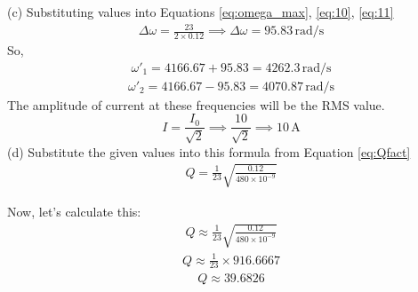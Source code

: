 \documentclass[journal,12pt,twocolumn]{IEEEtran}
\theoremstyle{remark}
\begin{document}
(c)
Substituting values into Equations \eqref{eq:omega_max}, \eqref{eq:10}, \eqref{eq:11}
\begin{align}
    \Delta\omega = \frac{23}{2 \times 0.12} \implies \Delta\omega = 95.83 \, \text{rad/s}
\end{align}
So,
\begin{align}
    \omega'_1 = 4166.67 + 95.83 = 4262.3 \, \text{rad/s} 
\end{align}
\begin{align}
    \omega'_2 = 4166.67 - 95.83 = 4070.87 \, \text{rad/s} 
\end{align}
The amplitude of current at these frequencies will be the RMS value.
\[
    I = \frac{I_0}{\sqrt{2}} \implies \frac{10}{\sqrt{2}} \implies 10 \, \text{A}
\]
(d)
Substitute the given values into this formula from Equation \eqref{eq:Qfact}
\begin{align}
    Q = \frac{1}{23} \sqrt{\frac{0.12}{480 \times 10^{-9}}} 
\end{align}

Now, let's calculate this:
\begin{align}
    Q \approx \frac{1}{23} \sqrt{\frac{0.12}{480 \times 10^{-9}}} 
\end{align}
\begin{align}
    Q \approx \frac{1}{23} \times 916.6667 
\end{align}
\begin{align}
    Q \approx 39.6826 
\end{align}
\end{document}
